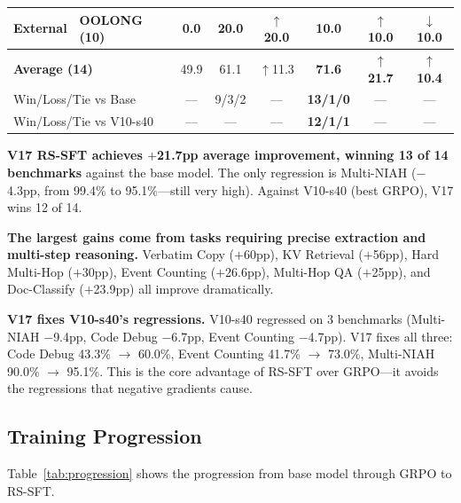 \documentclass{article}
\begin{document}
\begin{table}[t]
\begin{center}
\begin{small}
\begin{tabular}{llcccccc}
\midrule
External & OOLONG (10) & 0.0 & \textbf{20.0} & $\uparrow$20.0 & 10.0 & $\uparrow$10.0 & $\downarrow$10.0 \\
\midrule
\multicolumn{2}{l}{\textbf{Average (14)}} & 49.9 & 61.1 & $\uparrow$11.3 & \textbf{71.6} & $\uparrow$\textbf{21.7} & $\uparrow$\textbf{10.4} \\
\multicolumn{2}{l}{Win/Loss/Tie vs Base} & --- & 9/3/2 & --- & \textbf{13/1/0} & --- & --- \\
\multicolumn{2}{l}{Win/Loss/Tie vs V10-s40} & --- & --- & --- & \textbf{12/1/1} & --- & --- \\
\bottomrule
\end{tabular}
\end{small}
\end{center}
\vskip -0.15in
\end{table}

\textbf{V17 RS-SFT achieves $+$21.7pp average improvement, winning 13 of 14 benchmarks} against the base model. The only regression is Multi-NIAH ($-$4.3pp, from 99.4\% to 95.1\%---still very high). Against V10-s40 (best GRPO), V17 wins 12 of 14.

\textbf{The largest gains come from tasks requiring precise extraction and multi-step reasoning.} Verbatim Copy ($+$60pp), KV Retrieval ($+$56pp), Hard Multi-Hop ($+$30pp), Event Counting ($+$26.6pp), Multi-Hop QA ($+$25pp), and Doc-Classify ($+$23.9pp) all improve dramatically.

\textbf{V17 fixes V10-s40's regressions.} V10-s40 regressed on 3 benchmarks (Multi-NIAH $-$9.4pp, Code Debug $-$6.7pp, Event Counting $-$4.7pp). V17 fixes all three: Code Debug 43.3\% $\to$ 60.0\%, Event Counting 41.7\% $\to$ 73.0\%, Multi-NIAH 90.0\% $\to$ 95.1\%. This is the core advantage of RS-SFT over GRPO---it avoids the regressions that negative gradients cause.

\subsection{Training Progression}
\label{sec:progression}

Table~\ref{tab:progression} shows the progression from base model through GRPO to RS-SFT.
\end{document}
